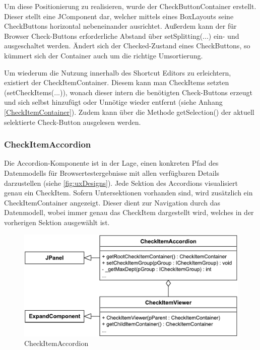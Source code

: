 Um diese Positionierung zu realisieren, wurde der CheckButtonContainer erstellt. Dieser stellt eine JComponent dar, welcher mittels eines BoxLayouts seine CheckButtons horizontal nebeneinander ausrichtet. Außerdem kann der für Browser Check-Buttons erforderliche Abstand über setSplitting(...) ein- und ausgeschaltet werden. Ändert sich der Checked-Zustand eines CheckButtons, so kümmert sich der Container auch um die richtige Umsortierung.

Um wiederum die Nutzung innerhalb des Shortcut Editors zu erleichtern, existiert der CheckItemContainer. Diesem kann man CheckItems setzten (setCheckItems(...)), wonach dieser intern die benötigten Check-Buttons erzeugt und sich selbst hinzufügt oder Unnötige wieder entfernt (siehe Anhang \ref{CheckItemContainer}). Zudem kann über die Methode getSelection() der aktuell selektierte Check-Button ausgelesen werden.

\subsubsection{CheckItemAccordion}

Die Accordion-Komponente ist in der Lage, einen konkreten Pfad des Datenmodells für Browsertestergebnisse mit allen verfügbaren Details darzustellen (siehe \autoref{fig:uxDesigns}).
Jede Sektion des Accordions visualisiert genau ein CheckItem. Sofern Untersektionen vorhanden sind, wird zusätzlich ein CheckItemContainer angezeigt. Dieser dient zur Navigation durch das Datenmodell, wobei immer genau das CheckItem dargestellt wird, welches in der vorherigen Sektion ausgewählt ist.

\begin{figure}
	\vspace{-12px}
	\centering
	\includegraphics[width=0.95\linewidth]{../graphic/diagrams/CD_CheckItemAccordion/CheckItemAccordion}
	\caption{CheckItemAccordion}
	\label{fig:checkitemaccordion}
\end{figure}


